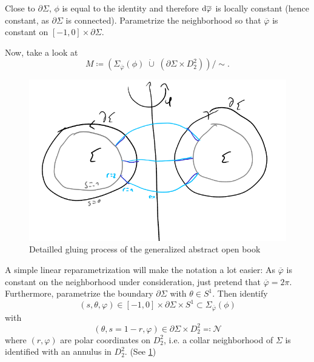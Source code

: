 Close to $\partial \Sigma$, $\phi$ is equal to the identity and therefore $\mathrm{d} \overline{\varphi}$ is locally constant (hence constant, as $\partial \Sigma$ is connected).
Parametrize the neighborhood so that $\overline{\varphi}$ is constant on $[-1,0]\times \partial \Sigma$.

Now, take a look at
\[
    M \coloneqq \left(\Sigma_{\overline{\varphi}}(\phi)\; \dot\cup\; \left(\partial \Sigma \times D_2^2\right)\right)/\sim.
\]
\begin{figure}
    \includegraphics[width=\textwidth]{images/abstract_open_book_gluing.png}
    \caption[Gluing an abstract open book]{Detailled gluing process of the generalized abstract open book}
    \label{fig:abstract_open_book_gluing}
\end{figure}
A simple linear reparametrization will make the notation a lot easier: As $\overline{\varphi}$ is constant on the neighborhood under consideration, just pretend that $\overline{\varphi} = 2\pi$.
Furthermore, parametrize the boundary $\partial \Sigma$ with $\theta \in S^1$.
Then identify 
\[
    (s, \theta, \varphi) \in [-1,0] \times \partial \Sigma \times S^1 \subset \Sigma_{\overline{\varphi}}(\phi)
\]
with
\[
    (\theta, s = 1-r, \varphi) \in \partial \Sigma \times D_2^2 \eqqcolon \mathcal{N}
\]
where $(r, \varphi)$ are polar coordinates on $D_2^2$, i.e. a collar neighborhood of $\Sigma$ is identified with an annulus in $D_2^2$.
(See \cref{fig:abstract_open_book_gluing})

